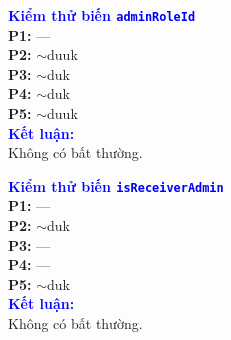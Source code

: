 \documentclass[11pt,a4paper]{article}
\begin{document}
\medskip
\noindent
\begin{minipage}[t]{0.485\textwidth}
\begin{tcolorbox}[colback=white, colframe=darkblue!35, boxrule=0.6pt, arc=2pt, left=4pt, right=4pt, top=4pt, bottom=4pt]
\begin{minipage}[t]{0.41\linewidth}
\scriptsize
\textbf{\textcolor{blue}{Kiểm thử biến \texttt{adminRoleId}}}\\[4pt]
\textbf{P1:} ---\\
\textbf{P2:} $\sim$duuk\\
\textbf{P3:} $\sim$duk\\
\textbf{P4:} $\sim$duk\\
\textbf{P5:} $\sim$duuk\\[6pt]
\textbf{\textcolor{blue}{Kết luận:}}\\
Không có bất thường.
\end{minipage}\hfill
\begin{minipage}[t]{0.57\linewidth}
\centering
\def\lblStart{}%
\def\lblFone{}%
\def\lblFtwo{}%
\def\lblFthree{d(role)}%
\def\lblFfour{u(role)}%
\def\lblFfive{u(role)}%
\def\lblFsix{}%
\def\lblFseven{}%
\def\lblFeight{}%
\def\lblFnine{}%
\def\lblFten{}%
\def\lblFeleven{}%
\def\lblFtwelve{}%
\def\lblFthirteen{}%
\def\lblFfourteen{}%
\resizebox{\linewidth}{!}{\DrawFriendRequestVarDFG}
\end{minipage}
\end{tcolorbox}
\end{minipage}\hfill
\begin{minipage}[t]{0.485\textwidth}
\begin{tcolorbox}[colback=white, colframe=darkblue!35, boxrule=0.6pt, arc=2pt, left=4pt, right=4pt, top=4pt, bottom=4pt]
\begin{minipage}[t]{0.41\linewidth}
\scriptsize
\textbf{\textcolor{blue}{Kiểm thử biến \texttt{isReceiverAdmin}}}\\[4pt]
\textbf{P1:} ---\\
\textbf{P2:} $\sim$duk\\
\textbf{P3:} ---\\
\textbf{P4:} ---\\
\textbf{P5:} $\sim$duk\\[6pt]
\textbf{\textcolor{blue}{Kết luận:}}\\
Không có bất thường.
\end{minipage}\hfill
\begin{minipage}[t]{0.57\linewidth}
\centering
\def\lblStart{}%
\def\lblFone{}%
\def\lblFtwo{}%
\def\lblFthree{}%
\def\lblFfour{}%
\def\lblFfive{d(adm)}%
\def\lblFsix{u(adm)}%
\def\lblFseven{}%
\def\lblFeight{}%
\def\lblFnine{}%
\def\lblFten{}%
\def\lblFeleven{}%
\def\lblFtwelve{}%
\def\lblFthirteen{}%
\def\lblFfourteen{}%
\resizebox{\linewidth}{!}{\DrawFriendRequestVarDFG}
\end{minipage}
\end{tcolorbox}
\end{minipage}
\end{document}
